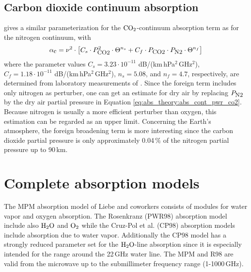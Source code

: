 \subsection{Carbon dioxide continuum absorption}
\label{levelc:co2cont}
\citet{pwr:93} gives a similar parameterization for the $\mbox{CO}_2$-continuum 
absorption term as for the nitrogen continuum, with 
\begin{equation}
  \label{eq:abs_theory:abs_cont_pwr_co2}
    \alpha_{\mbox{\small c}} =   \nu^2 \cdot  
                \left[ C_s \cdot P_{\mbox{\rm \small CO2}}^2           \cdot \Theta^{n_s} +
                       C_f \cdot P_{\mbox{\rm \small CO2}}  \cdot P_{\mbox{\rm \small N2}} \cdot \Theta^{n_f} \right]
\end{equation}
where the parameter values $C_s = 3.23\cdot 10^{-11}$
dB/(km\,hPa$^2$\,GHz$^2$), $C_f = 1.18\cdot 10^{-11}$
dB/(km\,hPa$^2$\,GHz$^2$), $n_s=5.08$, and $n_f=4.7$, respectively, 
are determined from laboratory measurements of \citet{ho:66,dagg:75}. 
Since the foreign term
includes only nitrogen as perturber, one can get an estimate for dry
air by replacing $P_{\mbox{\rm \small N2}}$ by the dry air partial pressure in
Equation \ref{eq:abs_theory:abs_cont_pwr_co2}. Because nitrogen is usually a more
efficient perturber than oxygen, this estimation can be regarded as an
upper limit. Concerning the Earth's atmosphere, the foreign broadening
term is more interesting since the carbon dioxide partial pressure is
only approximately 0.04\,\% of the nitrogen partial pressure up to
90\,km.






\section{Complete absorption models}
\label{sec:abs_theory:CompAbsMod}
The MPM absorption model of Liebe and coworkers consists of modules for 
water vapor and oxygen absorption. The Rosenkranz (PWR98) absorption 
model include also $\mbox{H}_2\mbox{O}$ and $\mbox{O}_2$ while the Cruz-Pol et al. (CP98) absorption 
models include absorption due to water vapor. Additionally 
the CP98 model has a strongly reduced parameter set for the $\mbox{H}_2\mbox{O}$-line 
absorption since it is especially intended for the range around the 
22\,GHz water line. The MPM and R98 are valid from the microwave 
up to the submillimeter frequency range (1-1000\,GHz).

